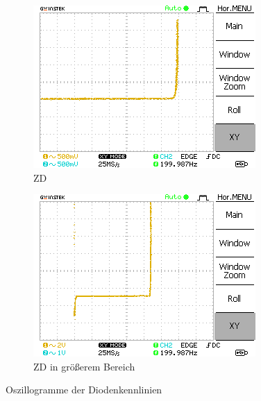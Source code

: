 \begin{figure}[H]
\begin{subfigure}[b]{0.45\textwidth}
        \includegraphics[width=\textwidth]{figs/2/DS0002.png}
        \caption{ZD}
        \label{fig:2_ZD_1}
    \end{subfigure}
    \hfill
    \begin{subfigure}[b]{0.45\textwidth}
        \includegraphics[width=\textwidth]{figs/2/DS0003.png}
        \caption{ZD in größerem Bereich}
        \label{fig:2_ZD_2}
    \end{subfigure}
    \caption{Oszillogramme der Diodenkennlinien}
\end{figure}


